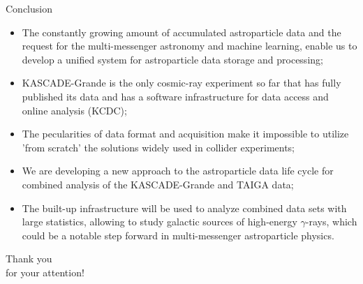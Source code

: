 \begin{frame}{Conclusion}
\small
\begin{itemize}
  \item The constantly growing amount of accumulated astroparticle data and the request for the multi-messenger astronomy and machine learning, enable us to develop a unified system for astroparticle data storage and processing;
  \item KASCADE-Grande is the only cosmic-ray experiment so far that has fully published its data and has a software infrastructure for data access and online analysis (KCDC);
  \item The pecularities of data format and acquisition make it impossible to utilize 'from scratch' the solutions widely used in collider experiments;
  \item We are developing a new approach to the astroparticle data life cycle for combined analysis of the KASCADE-Grande and TAIGA data;
  \item The built-up infrastructure will be used to analyze combined data sets with large statistics, allowing to study galactic sources of high-energy $\gamma$-rays, 
  which could be a notable step forward in multi-messenger astroparticle physics.

\end{itemize}
\end{frame}

\begin{frame}{}
  \begin{center}
    \textcolor{kit-green100}{\Huge Thank you\\for your attention!\vspace{1em}}

  \end{center}
\end{frame}
